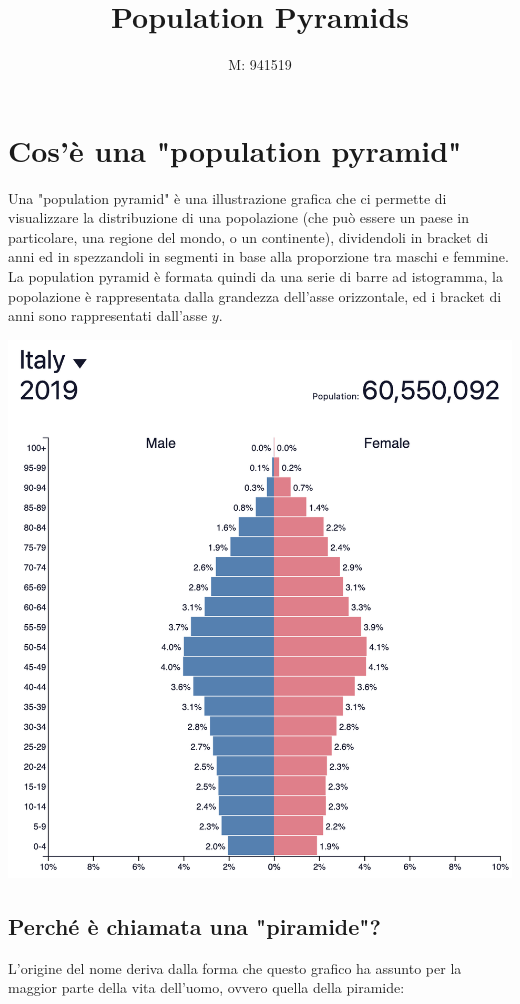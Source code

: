 \documentclass[11pt, oneside]{article}   	%
\title{Population Pyramids}
\author{M: 941519}
\begin{document}
\maketitle


\tableofcontents
\pagebreak
\section{Cos'è una "population pyramid"}
Una "population pyramid" è una illustrazione grafica che ci permette di visualizzare la distribuzione di una popolazione (che può essere un paese in particolare, una regione del mondo, o un continente), dividendoli in bracket di anni ed in spezzandoli in segmenti in base alla proporzione tra maschi e femmine.\\

La population pyramid è formata quindi da una serie di barre ad istogramma, la popolazione è rappresentata dalla grandezza dell'asse orizzontale, ed i bracket di anni sono rappresentati dall'asse $y$.


\begin{center}
\includegraphics[scale=0.6]{pop}
\end{center}

\subsection{Perché è chiamata una "piramide"?}
L'origine del nome deriva dalla forma che questo grafico ha assunto per la maggior parte della vita dell'uomo, ovvero quella della piramide:
\end{document}
